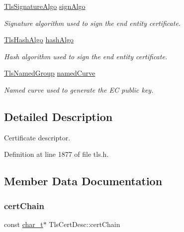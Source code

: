 \begin{DoxyCompactItemize}
\hyperlink{tls_8h_abe6ce436cb0d777df29e0af7bf800223}{Tls\+Signature\+Algo} \hyperlink{structTlsCertDesc_a6859e171d20df5e0c0ec12b940d90822}{sign\+Algo}
\begin{DoxyCompactList}\small\item\em Signature algorithm used to sign the end entity certificate. \end{DoxyCompactList}\item 
\hyperlink{tls_8h_a98b0299cd7e197edc67123642089156d}{Tls\+Hash\+Algo} \hyperlink{structTlsCertDesc_ad579e322e6688389f98141972794e243}{hash\+Algo}
\begin{DoxyCompactList}\small\item\em Hash algorithm used to sign the end entity certificate. \end{DoxyCompactList}\item 
\hyperlink{tls_8h_ae51675bb94f1945c0eed549ef93e6b51}{Tls\+Named\+Group} \hyperlink{structTlsCertDesc_a8b80a193be9a9d1064b2226ce1dce6bd}{named\+Curve}
\begin{DoxyCompactList}\small\item\em Named curve used to generate the EC public key. \end{DoxyCompactList}\end{DoxyCompactItemize}


\subsection{Detailed Description}
Certificate descriptor. 

Definition at line 1877 of file tls.\+h.



\subsection{Member Data Documentation}
\mbox{\label{structTlsCertDesc_ae944e03a44368e92bb4955f890381d3d}} 
\subsubsection{\texorpdfstring{cert\+Chain}{certChain}}
{\footnotesize\ttfamily const \hyperlink{compiler__port_8h_a40bb5262bf908c328fbcfbe5d29d0201}{char\+\_\+t}$\ast$ Tls\+Cert\+Desc\+::cert\+Chain}



